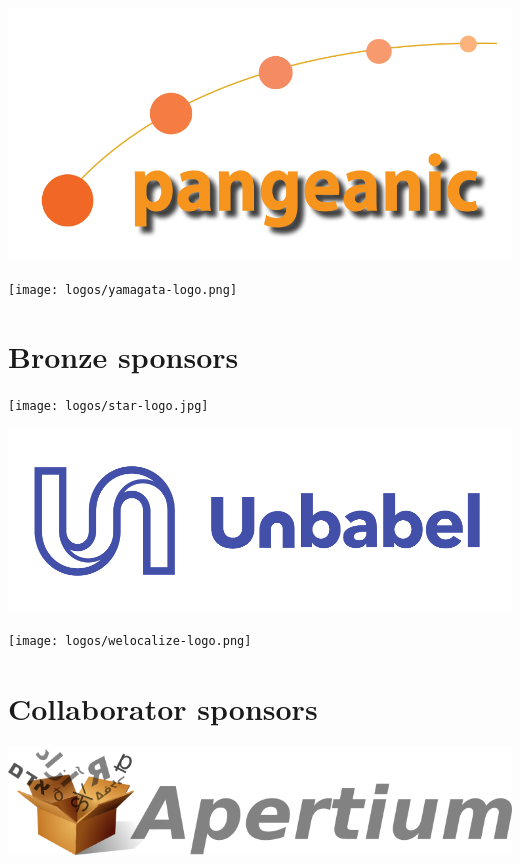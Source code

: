 \documentclass[a4paper,11pt,twoside]{book}
\begin{document}
\vfill

\begin{center}
\includegraphics[width=0.8\columnwidth]{logos/pangeanic-logo.png}

\vfill

\texttt{[image: logos/yamagata-logo.png]}
\end{center}

\vfill

\newpage

\section*{Bronze sponsors}
\vfill

\begin{center}
\texttt{[image: logos/star-logo.jpg]}

\vfill

\includegraphics[width=0.75\columnwidth]{logos/unbabel-logo.png}

\vfill

\texttt{[image: logos/welocalize-logo.png]}

\end{center}
\vfill
\newpage

\section*{Collaborator sponsors}
\begin{center}
\includegraphics[width=0.55\columnwidth]{logos/apertium-logo.png}
\end{center}
\end{document}
